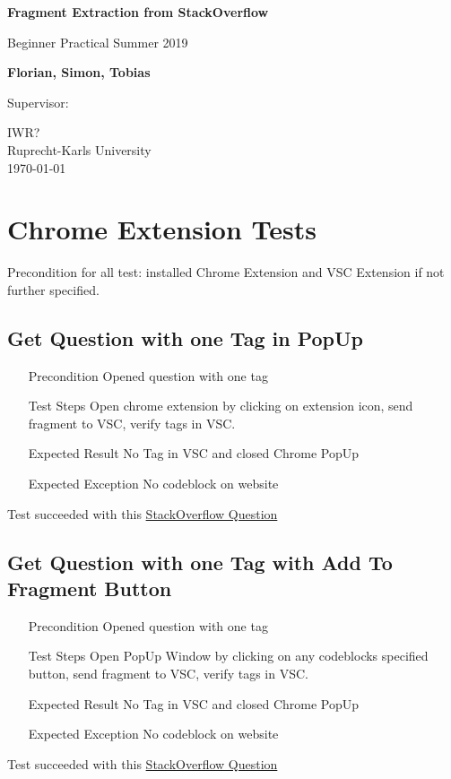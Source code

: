 \documentclass{report}
\begin{document}
\begin{titlepage}
	\begin{center}
	\vspace*{1cm}
	\Huge

	\textbf{Fragment Extraction from StackOverflow}

	\vspace{0.5cm}
	\LARGE

	Beginner Practical Summer 2019

	\vspace{1.5cm}

	\textbf{Florian, Simon, Tobias}

	\vspace{1cm}
	Supervisor:
	\vfill


	\vspace{1.8cm}
	\Large
	IWR?\\
	Ruprecht-Karls University\\
	\today
	\end{center}
    \end{titlepage}

\section*{Chrome Extension Tests}
Precondition for all test: installed Chrome Extension and VSC Extension if not further specified.
\subsection*{Get Question with one Tag in PopUp}
\begin{itemize}
	\item[Precondition] Opened question with one tag
	\item[Test Steps] Open chrome extension by clicking on extension icon, send fragment to VSC, verify tags
		in VSC.
	\item[Expected Result] No Tag in VSC and closed Chrome PopUp
	\item[Expected Exception] No codeblock on website
\end{itemize}
Test succeeded with this
\href{https://stackoverflow.com/questions/6393943/convert-javascript-string-in-dot-notation-into-an-object-reference}{StackOverflow Question}

\subsection*{Get Question with one Tag with Add To Fragment Button}
\begin{itemize}
	\item[Precondition] Opened question with one tag
	\item[Test Steps] Open PopUp Window by clicking on any codeblocks specified button, send
		fragment to VSC, verify tags in VSC.
	\item[Expected Result] No Tag in VSC and closed Chrome PopUp
	\item[Expected Exception] No codeblock on website
\end{itemize}
Test succeeded with this
\href{https://stackoverflow.com/questions/6393943/convert-javascript-string-in-dot-notation-into-an-object-reference}{StackOverflow Question}
\end{document}
